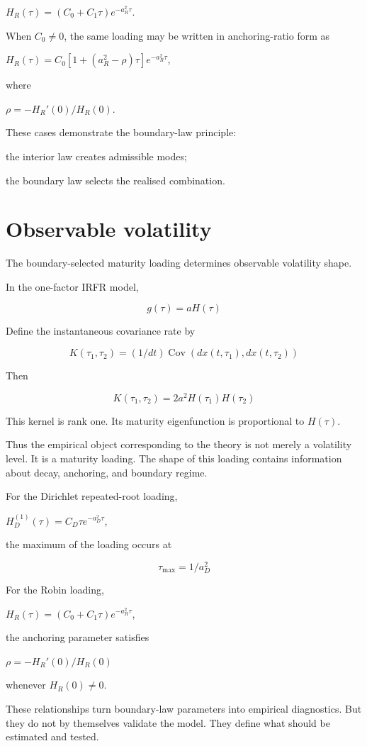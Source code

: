 \documentclass[11pt,oneside]{book}
\begin{document}
$H_R(\tau)=(C_0+C_1\tau)e^{-a_R^2\tau}$.

When $C_0\neq0$, the same loading may be written in anchoring-ratio form as

$H_R(\tau)=C_0[1+(a_R^2-\rho)\tau]e^{-a_R^2\tau}$,

where

$\rho=-H_R'(0)/H_R(0)$.

These cases demonstrate the boundary-law principle:

the interior law creates admissible modes;

the boundary law selects the realised combination.

\section{Observable volatility}\label{observable-volatility}

The boundary-selected maturity loading determines observable volatility
shape.

In the one-factor IRFR model,

\[
g(\tau)=aH(\tau)
\]

Define the instantaneous covariance rate by

\[
K(\tau_1,\tau_2) = (1/dt) \operatorname{Cov}(dx(t,\tau_1), dx(t,\tau_2))
\]

Then

\[
K(\tau_1,\tau_2)=2a^2H(\tau_1)H(\tau_2)
\]

This kernel is rank one. Its maturity eigenfunction is proportional to
$H(\tau)$.

Thus the empirical object corresponding to the theory is not merely a
volatility level. It is a maturity loading. The shape of this loading
contains information about decay, anchoring, and boundary regime.

For the Dirichlet repeated-root loading,

$H_D^{(1)}(\tau)=C_D\tau e^{-a_D^2\tau}$,

the maximum of the loading occurs at

\[
\tau_{\max} = 1/a_D^2
\]

For the Robin loading,

$H_R(\tau)=(C_0+C_1\tau)e^{-a_R^2\tau}$,

the anchoring parameter satisfies

$\rho=-H_R'(0)/H_R(0)$

whenever $H_R(0)\neq0$.

These relationships turn boundary-law parameters into empirical
diagnostics. But they do not by themselves validate the model. They
define what should be estimated and tested.
\end{document}
